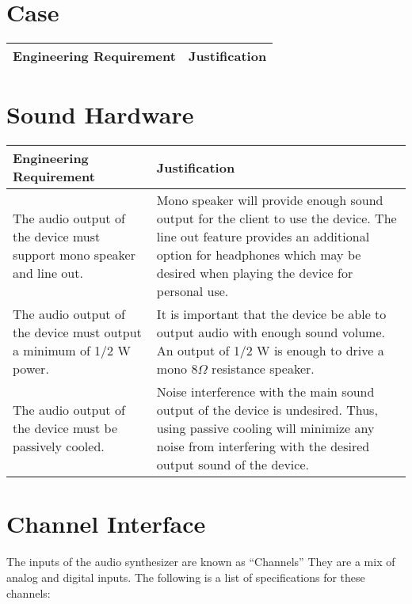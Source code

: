\documentclass{article}
\begin{document}
\section{Case}

\begin{tabular}{|p{3in}|p{3in}|}
\hline
Engineering Requirement & Justification \\
\hline
\end{tabular}


\section{Sound Hardware}

\begin{tabular}{|p{3in}|p{3in}|}
\hline
Engineering Requirement & Justification \\
\hline
The audio output of the device must support mono speaker and line out.&Mono speaker will provide enough sound output for the client to use the device.  The line out feature provides an additional option for headphones which may be desired when playing the device for personal use.\\
\hline
The audio output of the device must output a minimum of 1/2 W power.&It is important that the device be able to output audio with enough sound volume.  An output of 1/2 W is enough to drive a mono 8${\Omega}$ resistance speaker.\\
\hline
The audio output of the device must be passively cooled.&Noise interference with the main sound output of the device is undesired.  Thus, using passive cooling will minimize any noise from interfering with the desired output sound of the device.\\
\hline
\end{tabular}


\section{Channel Interface}

The inputs of the audio synthesizer are known as ``Channels'' They are
a mix of analog and digital inputs. The following is a list of
specifications for these channels:

\vspace {.3in}
\end{document}
